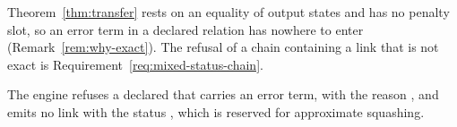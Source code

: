 
Theorem~\ref{thm:transfer} rests on an equality of output states and has no
penalty slot, so an error term in a declared relation has nowhere to enter
(Remark~\ref{rem:why-exact}). The refusal of a chain containing a link that
is not exact is Requirement~\ref{req:mixed-status-chain}.

\begin{requirement}\label{req:no-approximate-relations}
The engine refuses a declared  that carries an error
term, with the reason , and emits no
link with the status , which is reserved for
approximate squashing.
\end{requirement}
